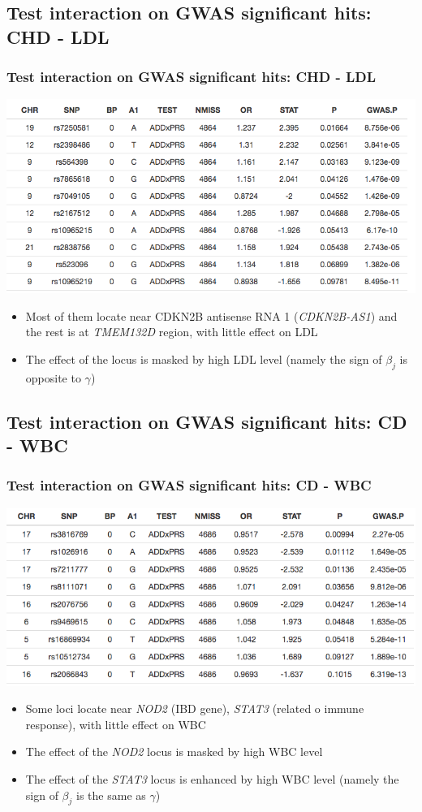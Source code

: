 \documentclass{beamer}
\begin{document}
  \subsection{Test interaction on GWAS significant hits: CHD - LDL}
  \begin{frame}
  \frametitle{Test interaction on GWAS significant hits: CHD - LDL}
    \centering
    \includegraphics[width=.8\linewidth]{ldl}
    \label{fig:ldl}
    \begin{itemize}
      \item Most of them locate near CDKN2B antisense RNA 1 (\textit{CDKN2B-AS1}) and the rest is at \textit{TMEM132D} region, with little effect on LDL
      \item The effect of the locus is masked by high LDL level (namely the sign of $\beta_j$ is opposite to $\gamma$)
    \end{itemize}
  \end{frame}

  \subsection{Test interaction on GWAS significant hits: CD - WBC}
  \begin{frame}
  \frametitle{Test interaction on GWAS significant hits: CD - WBC}
    \centering
    \includegraphics[width=.8\linewidth]{wbc}
    \label{fig:wbc}
    \begin{itemize}
      \item Some loci locate near \textit{NOD2} (IBD gene), \textit{STAT3} (related o immune response), with little effect on WBC
      \item The effect of the \textit{NOD2} locus is masked by high WBC level
      \item The effect of the \textit{STAT3} locus is enhanced by high WBC level (namely the sign of $\beta_j$ is the same as $\gamma$)
    \end{itemize}
  \end{frame}
\end{document}
